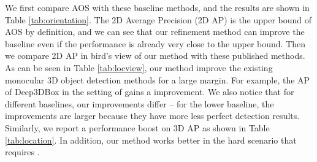 \documentclass[runningheads]{llncs}
\begin{document}
We first compare AOS with these baseline methods, and the results are shown in Table \ref{tab:orientation}. The 2D Average Precision (2D AP) is the upper bound of AOS by definition, and we can see that our refinement method can improve the baseline even if the performance is already very close to the upper bound. Then we compare 2D AP in bird's view of our method with these published methods. As can be seen in Table \ref{tab:locview}, our method improve the existing monocular 3D object detection methods for a large margin. For example, the AP of Deep3DBox in the setting of  gains a  improvement. We also notice that for different baselines, our improvements differ -- for the lower baseline, the improvements are larger because they have more less perfect detection results. Similarly, we report a performance boost on 3D AP as shown in Table \ref{tab:location}. In addition, our method works better in the hard scenario that requires . 
\end{document}
